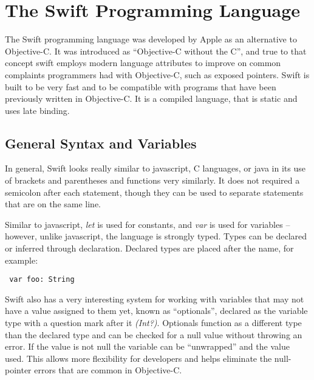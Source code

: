 \documentclass{article}
\begin{document}
     


\section{The Swift Programming Language}
The Swift programming language was developed by Apple as an alternative to Objective-C. It was introduced as “Objective-C without the C”, and true to that concept swift employs modern language attributes to improve on common complaints programmers had with Objective-C, such as exposed pointers. Swift is built to be very fast and to be compatible with programs that have been previously written in Objective-C. It is a compiled language, that is static and uses late binding.

\subsection{General Syntax and Variables  \cite{Swift}\cite{SwiftPL}}
In general, Swift looks really similar to javascript, C languages, or java in its use of brackets and parentheses and functions very similarly. It does not required a semicolon after each statement, though they can be used to separate statements that are on the same line.

\vskip 0.2in

Similar to javascript,  \emph{let} is used for constants, and \emph{var} is used for variables -- however, unlike javascript,  the language is strongly typed. Types can be declared or inferred through declaration. Declared types are placed after the name, for example: \par

\begin{verbatim} var foo: String \end{verbatim} 

Swift also has a very interesting system for working with variables that may not have a value assigned to them yet, known as “optionals”, declared as the variable type with a question mark after it \emph{(Int?)}.  Optionals function as a different type than the declared type and can be checked for a null value without throwing an error. If the value is not null the variable can be “unwrapped” and the value used. This allows more flexibility for developers and helps eliminate the null-pointer errors that are common in Objective-C. \par
\end{document}
